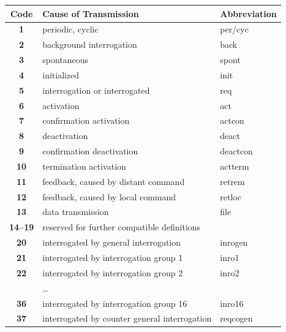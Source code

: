 \begin{table}[H]
\centering
    \begin{tabularx}{\textwidth}{|c|X|l|}
        \hline
        \textbf{Code} & \textbf{Cause of Transmission} & \textbf{Abbreviation} \\ \hline
        \textbf{1}  & periodic, cyclic      & per/cyc \\ \hline
\textbf{2}  & background interrogation      & back \\ \hline
\textbf{3}  & spontaneous       & spont \\ \hline
\textbf{4}  & initialized       & init \\ \hline
\textbf{5}  & interrogation or interrogated         & req \\ \hline
\textbf{6}  & activation        & act \\ \hline
\textbf{7}  & confirmation activation       & actcon \\ \hline
\textbf{8}  & deactivation      & deact \\ \hline
\textbf{9}  & confirmation deactivation         & deactcon \\ \hline
\textbf{10} & termination activation        & actterm \\ \hline
\textbf{11} & feedback, caused by distant command       & retrem \\ \hline
\textbf{12} & feedback, caused by local command         & retloc \\ \hline
\textbf{13} & data transmission         & file \\ \hline
\textbf{14--19} & reserved for further compatible definitions & \\ \hline
\textbf{20} & interrogated by general interrogation         & inrogen \\ \hline
\textbf{21} & interrogated by interrogation group 1         & inro1 \\ \hline
\textbf{22} & interrogated by interrogation group 2         & inro2 \\ \hline
  & \dots & \\ \hline
\textbf{36} & interrogated by interrogation group 16        & inro16 \\ \hline
\textbf{37} & interrogated by counter general interrogation         & reqcogen \\ \hline

\end{tabularx}
\end{table}
